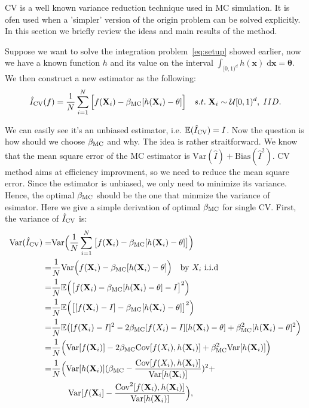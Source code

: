 
CV is a well known variance reduction technique used in MC simulation. 
It is ofen used when a 'simpler' version of the origin problem can be solved explicitly. In this section we briefly review the ideas and main results of the method.
 
Suppose we want to solve the integration problem~\eqref{eq:setup} showed earlier, now we have a known function $h$ and its value on the interval
$\int_{[0,1)^d} h(\mathbf{x})\;\textrm{d}\mathbf{x} = \mathbf{\theta}$. 
We then construct a new estimator as the following:
\[\hat{I}_{\mathrm{CV}}(f)=\frac{1}{N}\sum_{i=1}^{N}\Big[ f(\mathbf{X}_i)-\beta_{\mathrm{MC}}[h(\mathbf{X}_i)-\theta] \Big] \quad s.t.\; \mathbf{X}_i\sim \mathcal{U}[0,1)^d, \;IID.\]

We can easily see it's an unbiased estimator, i.e. $\mathbb{E}(\hat{I}_{\mathrm{CV}}) = I$.
Now the question is how should we choose $\beta_{\mathrm{MC}}$ and why.
The idea is rather straitforward. 
We know that the mean square error of the MC estimator is $\mathrm{Var}(\hat{I})+\mathrm{Bias}(\hat{I}^2)$. 
CV method aims at efficiency improvment, so we need to reduce the mean square error. 
Since the estimator is unbiased, we only need to minimize its variance.
Hence, the optimal $\beta_{\mathrm{MC}}$ should be the one that minmize the variance of esimator.
Here we give a simple derivation of optimal $\beta_{\mathrm{MC}}$ for single CV.
First, the variance of $\hat{I}_{\mathrm{CV}}$ is: 
\begin{align*}
	\mathrm{Var}(\hat{I}_{\mathrm{CV}})
    =&\mathrm{Var}\Big( \frac{1}{N}\sum_{i=1}^{N}\big[ f(\mathbf{X}_i)-\beta_{\mathrm{MC}}[h(\mathbf{X}_i)-\theta] \big]\Big)\\
    =&\frac{1}{N}\mathrm{Var}\Big(f(\mathbf{X}_i)-\beta_{\mathrm{MC}}[h(\mathbf{X}_i)-\theta]\Big)\quad \text{by $X_i$ i.i.d} \\
    =&\frac{1}{N}\mathbb{E}\Big(\big[f(\mathbf{X}_i)-\beta_{\mathrm{MC}}[h(\mathbf{X}_i)-\theta]-I\big]^2 \Big) \\
    =&\frac{1}{N}\mathbb{E}\Big(\big[ [f(\mathbf{X}_i)-I] -\beta_{\mathrm{MC}}[h(\mathbf{X}_i)-\theta]\big]^2 \Big) \\
    =&\frac{1}{N}\mathbb{E}\big([f(\mathbf{X}_i)-I]^2-2\beta_{\mathrm{MC}}[f(X_i)-I][h(\mathbf{X}_i)-\theta]+\beta_{\mathrm{MC}}^2[h(\mathbf{X}_i)-\theta]^2 \Big)\\
    =&\frac{1}{N}\Big(\mathrm{Var}[f(\mathbf{X}_i)]-2\beta_{\mathrm{MC}}\mathrm{Cov}[f(X_i),h(\mathbf{X}_i)]+\beta_{\mathrm{MC}}^2\mathrm{Var}[h(\mathbf{X}_i)]\Big)\\
    =&\frac{1}{N}\Big(\mathrm{Var}[h(\mathbf{X}_i)](\beta_{\mathrm{MC}}-\frac{\mathrm{Cov}[f(X_i),h(\mathbf{X}_i)]}{\mathrm{Var}[h(\mathbf{X}_i)]})^2+\\
     &\quad \quad \mathrm{Var}[f(\mathbf{X}_i]-\frac{\mathrm{Cov}^2[f(\mathbf{X}_i),h(\mathbf{X}_i)]}{\mathrm{Var}[h(\mathbf{X}_i)]} \Big),
\end{align*}
